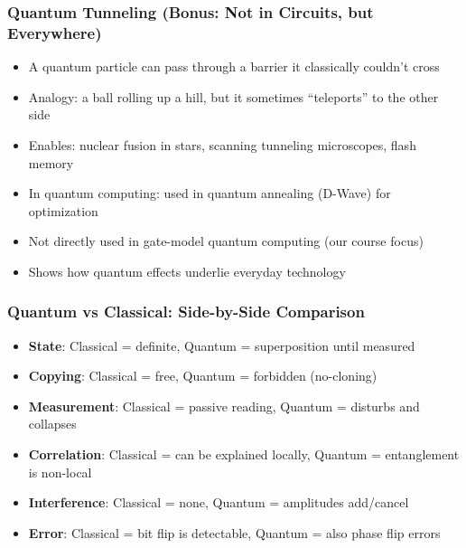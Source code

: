 \begin{frame}[fragile]\frametitle{Quantum Tunneling (Bonus: Not in Circuits, but Everywhere)}
\begin{itemize}
\item A quantum particle can pass through a barrier it classically couldn't cross
\item Analogy: a ball rolling up a hill, but it sometimes ``teleports'' to the other side
\item Enables: nuclear fusion in stars, scanning tunneling microscopes, flash memory
\item In quantum computing: used in quantum annealing (D-Wave) for optimization
\item Not directly used in gate-model quantum computing (our course focus)
\item Shows how quantum effects underlie everyday technology
\end{itemize}
\end{frame}

\begin{frame}[fragile]\frametitle{Quantum vs Classical: Side-by-Side Comparison}
\begin{itemize}
\item \textbf{State}: Classical = definite, Quantum = superposition until measured
\item \textbf{Copying}: Classical = free, Quantum = forbidden (no-cloning)
\item \textbf{Measurement}: Classical = passive reading, Quantum = disturbs and collapses
\item \textbf{Correlation}: Classical = can be explained locally, Quantum = entanglement is non-local
\item \textbf{Interference}: Classical = none, Quantum = amplitudes add/cancel
\item \textbf{Error}: Classical = bit flip is detectable, Quantum = also phase flip errors
\end{itemize}
\end{frame}

